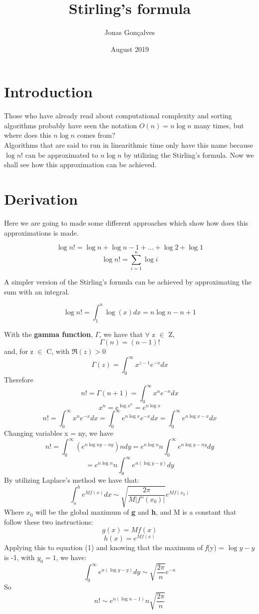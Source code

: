 \documentclass{article}
\title{Stirling's formula}
\author{Jonas Gonçalves}
\date{August 2019}
\begin{document}
\maketitle

\section{Introduction}
    Those who have already read about computational complexity and sorting algorithms probably have seen the notation \(O(n) = n\log{n}\) many times, but where does this \(n\log{n}\) comes from? \\
    Algorithms that are said to run in linearithmic time only have this name because \(\log{n!}\) can be approximated to \(n\log{n}\) by utilizing the Stirling's formula. Now we shall see how this approximation can be achieved. 

\section{Derivation}
    Here we are going to made some different approaches which show how does this approximations is made.
    
    \[\log{n!} = \log{n} + \log{n-1} + \dots + \log{2} + \log{1}\]
    \[\log{n!} = \sum_{i = 1}^{n}\log{i}\]
    
    A simpler version of the Stirling's formula can be achieved by approximating the sum with an integral.
    
    \[\log{n!} = \int_1^n \log{(x)} dx = n\log{n} - n + 1\]
    
    With the \textbf{gamma function}, \(\Gamma\),  we have that \(\forall\) z \(\in\) Z,
    \[\Gamma(n) = (n-1)!\]
    and, for z \(\in\) C, with $\Re(z) > 0$
    \[\Gamma(z) = \int_0^\infty x^{z-1}e^{-x}dx\]
    Therefore
    \[ n! = \Gamma(n+1) = \int_0^\infty x^{n}e^{-n}dx\]
    \[ x^{n} = e^{\log{x^{n}}} = e^{n\log{x}}\]
    \[ n! = \int_0^\infty x^{n}e^{-x}dx = \int_0^\infty e^{n\log{x}}e^{-x}dx = \int_0^\infty e^{n\log{x} -x}dx\]
    Changing variables x = ny, we have
    \[n! = \int_0^\infty (e^{n\log{ny}-ny})ndy = e^{n\log{n}}n\int_0^\infty e^{n\log{y} - ny}dy \]
    \begin{equation}
    = e^{n\log{n}}n\int_0^\infty e^{n(\log{y}-y)}dy
    \end{equation}
    By utilizing Laplace's method we have that:
    \[\int_a^b e^{M\textit{f}(x)}dx \sim \sqrt{\frac{2\pi}{M|\textit{f''}(x_0)|}}e^{M\textit{f}(x_0)}\]
    Where \(x_0\) will be the global maximum of \textbf{g} and \textbf{h}, and M is a constant that follow these two instructions:
    \[g(x) = M\textit{f}(x)\]
    \[h(x) = e^{M\textit{f}(x)}\]
    Applying this to equation (1) and knowing that the maximum of \textit{f}(y) = \(\log{y} - y\) is -1, with \(y_0 = 1\), we have:
    \[\int_0^\infty e^{n(\log{y}-y)}dy \sim \sqrt{\frac{2\pi}{n}}e^{-n}\]
    So
    \begin{equation}
        n! \sim e^{n(\log{n} - 1)}n\sqrt{\frac{2\pi}{n}}
    \end{equation} 
    
\end{document}
